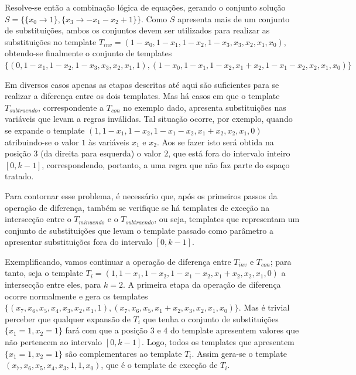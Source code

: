 \documentclass[12pt, a4paper]{article}
\begin{document}
Resolve-se então a combinação lógica de equações, gerando o conjunto solução $S = \{\{x_0\to 1\},\{x_3\to -x_1-x_2+1\}\}$. Como $S$ apresenta mais de um conjunto de substituições, ambos os conjuntos devem ser utilizados para realizar as substituições no template $T_{inv} = (1 - x_0, 1 - x_1, 1 - x_2, 1 - x_3, x_3, x_2, x_1, x_0)$, obtendo-se finalmente o conjunto de templates $\{(0, 1 - x_1, 1 - x_2, 1 - x_3, x_3, x_2, x_1, 1),(1 - x_0, 1 - x_1, 1 - x_2, x_1 + x_2, 1 - x_1 - x_2, x_2, x_1, x_0)\}$

Em diversos casos apenas as etapas descritas até aqui são suficientes para se realizar a diferença entre os dois templates. Mas há casos em que o template $T_{subtraendo}$, correspondente a $T_{con}$ no exemplo dado, apresenta substituições nas variáveis que levam a regras inválidas. Tal situação ocorre, por exemplo, quando se expande o template $(1, 1 - x_1, 1 - x_2, 1 - x_1 - x_2, x_1 + x_2, x_2, x_1, 0)$ atribuindo-se o valor $1$ às variáveis $x_1$ e $x_2$. Aos se fazer isto será obtida na posição $3$ (da direita para esquerda) o valor $2$, que está fora do intervalo inteiro $[0,k-1]$, correspondendo, portanto, a uma regra que não faz parte do espaço tratado.

Para contornar esse problema, é necessário que, após os primeiros passos da operação de diferença, também se verifique se há templates de exceção na intersecção entre o $T_{minuendo}$ e o $T_{subtraendo}$, ou seja, templates que representam um conjunto de substituições que levam o template passado como parâmetro a apresentar substituições fora do intervalo $[0,k-1]$. %

Exemplificando, vamos continuar a operação de diferença entre $T_{inv}$ e $T_{con}$; para tanto, seja o template $T_i = (1, 1 - x_1, 1 - x_2, 1 - x_1 - x_2, x_1 + x_2, x_2, x_1, 0)$ a intersecção entre eles, para $k=2$.
A primeira etapa da operação de diferença ocorre normalmente e gera os templates $\{(x_7, x_6, x_5, x_4, x_3, x_2, x_1, 1),(x_7, x_6, x_5, x_1 + x_2, x_3, x_2, x_1, x_0)\}$.
Mas é trivial perceber que qualquer expansão de $T_i$ que tenha o conjunto de substituições $\{x_1 = 1, x_2 = 1\}$ fará com que a posição $3$ e $4$ do template apresentem valores que não pertencem ao intervalo $[0,k-1]$.
Logo, todos os templates que apresentem $\{x_1 = 1, x_2 = 1\}$ são complementares ao template $T_i$. Assim gera-se o template $(x_7, x_6, x_5, x_4, x_3, 1, 1, x_0)$, que é o template de exceção de $T_i$.
\end{document}
